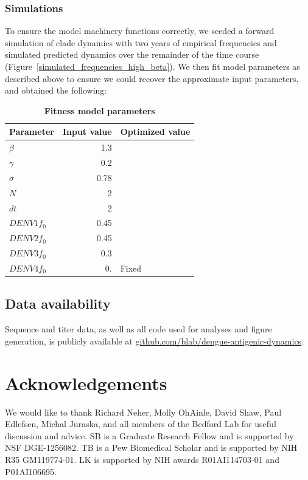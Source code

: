 \documentclass[11pt,oneside,letterpaper]{article}
\begin{document}
\subsubsection{Simulations}
To ensure the model machinery functions correctly, we seeded a forward simulation of clade dynamics with two years of empirical frequencies and simulated predicted dynamics over the remainder of the time course (Figure~\ref{simulated_frequencies_high_beta}).
We then fit model parameters as described above to ensure we could recover the approximate input parameters, and obtained the following:

\begin{table}[ht!]
  \begin{center}
    \label{fitness_model_parameters}
    \begin{tabular}{l|r|l}
      Parameter & Input value & Optimized value\\
      \hline
      $\beta$ & 1.3 & \\
      $\gamma$ & 0.2 & \\
      $\sigma$ & 0.78 & \\
      $N$ & 2 & \\
      $dt$ & 2 & \\
      $DENV1 f_{0}$ & 0.45 & \\
      $DENV2 f_{0}$ & 0.45 & \\
      $DENV3 f_{0}$ & 0.3 & \\
      $DENV4 f_{0}$ & 0. & Fixed\\
    \end{tabular}
    \caption{
    \textbf{Fitness model parameters}
    }
  \end{center}
\end{table}


\subsection*{Data availability}
Sequence and titer data, as well as all code used for analyses and figure generation, is publicly available at \href{https://github.com/blab/dengue-antigenic-dynamics}{github.com/blab/dengue-antigenic-dynamics}.

\section*{Acknowledgements}
We would like to thank Richard Neher, Molly OhAinle, David Shaw, Paul Edlefsen, Michal Juraska, and all members of the Bedford Lab for useful discussion and advice.
SB is a Graduate Research Fellow and is supported by NSF DGE-1256082.
TB is a Pew Biomedical Scholar and is supported by NIH R35 GM119774-01.
LK is supported by NIH awards R01AI114703-01 and P01AI106695.
\end{document}
